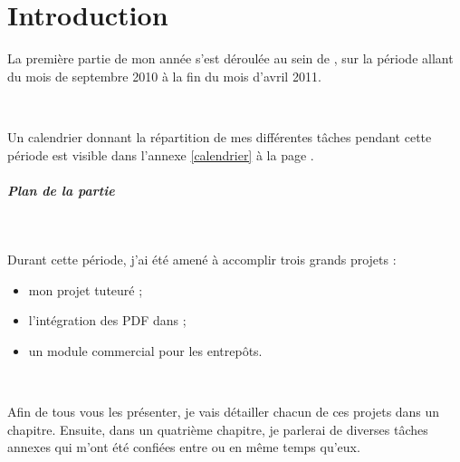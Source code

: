 \chapter{Introduction}
La première partie de mon année s'est déroulée au sein de \solulog, sur la période allant du mois de septembre 2010 à la fin du mois d'avril 2011.

~

Un calendrier donnant la répartition de mes différentes tâches pendant cette période est visible dans l'annexe \ref{calendrier} à la page \pageref{calendrier}.

\paragraph{Plan de la partie}
~

Durant cette période, j'ai été amené à accomplir trois grands projets :
\begin{itemize}
	\item mon projet tuteuré ;
	\item l'intégration des PDF dans \integrale ;
	\item un module commercial pour les entrepôts.
\end{itemize}

~

Afin de tous vous les présenter, je vais détailler chacun de ces projets dans un chapitre. Ensuite, dans un quatrième chapitre, je parlerai de diverses tâches annexes qui m'ont été confiées entre ou en même temps qu'eux.
